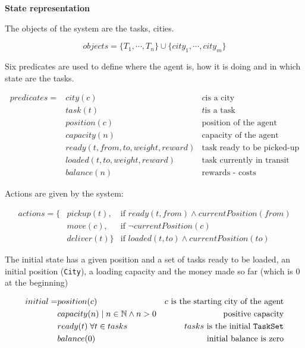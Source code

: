 \documentclass[11pt,a4paper]{article}
\begin{document}
\newpage
\medskip
\textbf{State representation}

The objects of the system are the tasks, cities.

$$ objects = \{T_1, \cdots, T_n\} \cup \{city_1, \cdots, city_m\} $$

Six predicates are used to define where the agent is, how it is doing and in
which state are the tasks.

\begin{align*}
predicates = &city(c)                            & c \text{is a city} \\
             &task(t)                            & t \text{is a task} \\
             &position(c)                        & \text{position of the agent}      \\
             &capacity(n)                        & \text{capacity of the agent}      \\
             &ready(t, from, to, weight, reward) & \text{task ready to be picked-up} \\
             &loaded(t, to, weight, reward)      & \text{task currently in transit}  \\
             &balance(n)                         & \text{rewards - costs}
\end{align*}

Actions are given by the system:

\begin{align*}
actions = \{&pickup(t),   & \text{if } ready(t, from) \wedge currentPosition(from) \\
            &move(c),     & \text{if } \lnot currentPosition(c)                    \\
            &deliver(t)\} & \text{if } loaded(t, to) \wedge currentPosition(to)
\end{align*}

The initial state has a given position and a set of tasks ready to be loaded,
an initial position (\texttt{City}), a loading capacity and the money made so
far (which is $0$ at the beginning)

\begin{align*}
    initial = &position(c)                            & c \text{ is the starting city of the agent} \\
              &capacity(n) \; | \; n \in \mathbb{N} \wedge n > 0   & \text{positive capacity} \\
              &ready(t) \; \forall t \in tasks                   & tasks \text{ is the initial \texttt{TaskSet}} \\
              &balance(0) & \text{initial balance is zero}
\end{align*}
\end{document}
